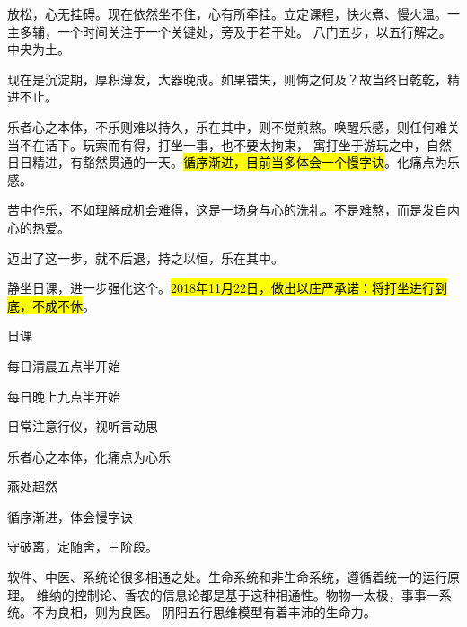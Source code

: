 放松，心无挂碍。现在依然坐不住，心有所牵挂。立定课程，快火煮、慢火温。一主多辅，一个时间关注于一个关键处，旁及于若干处。
八门五步，以五行解之。中央为土。

现在是沉淀期，厚积薄发，大器晚成。如果错失，则悔之何及？故当终日乾乾，精进不止。

乐者心之本体，不乐则难以持久，乐在其中，则不觉煎熬。唤醒乐感，则任何难关当不在话下。玩索而有得，打坐一事，也不要太拘束，
寓打坐于游玩之中，自然日日精进，有豁然贯通的一天。\hl{循序渐进，目前当多体会一个慢字诀}。化痛点为乐感。

苦中作乐，不如理解成机会难得，这是一场身与心的洗礼。不是难熬，而是发自内心的热爱。

迈出了这一步，就不后退，持之以恒，乐在其中。

静坐日课，进一步强化这个。\hl{2018年11月22日，做出以庄严承诺：将打坐进行到底，不成不休}。

日课
\begin{enumbox}
\item 每日清晨五点半开始
\item 每日晚上九点半开始
\item 日常注意行仪，视听言动思
\item 乐者心之本体，化痛点为心乐
\item 燕处超然
\item 循序渐进，体会慢字诀
\end{enumbox}

守破离，定随舍，三阶段。

软件、中医、系统论很多相通之处。生命系统和非生命系统，遵循着统一的运行原理。
维纳的控制论、香农的信息论都是基于这种相通性。物物一太极，事事一系统。不为良相，则为良医。
阴阳五行思维模型有着丰沛的生命力。
